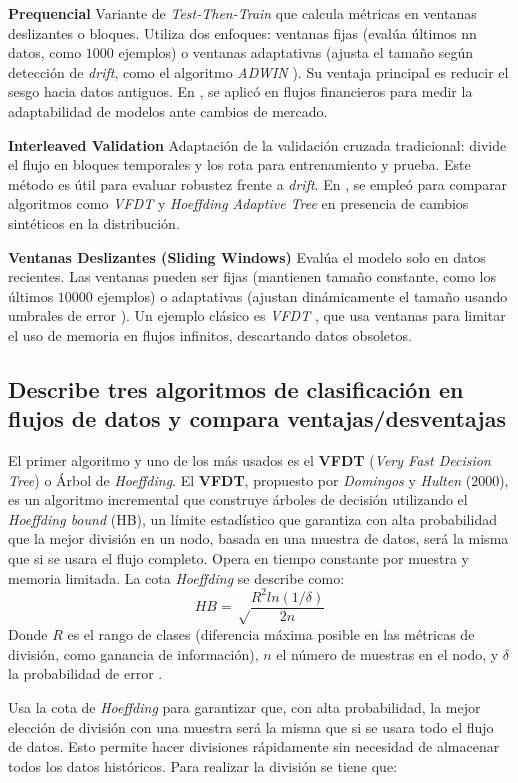 \documentclass[12pt,letterpaper]{article}
\begin{document}
\textbf{Prequencial}
Variante de \textit{Test-Then-Train} que calcula métricas en ventanas deslizantes o bloques. Utiliza dos enfoques: ventanas fijas (evalúa últimos nn datos, como $1000$ ejemplos) o ventanas adaptativas (ajusta el tamaño según detección de \textit{drift}, como el algoritmo \textit{ADWIN} \cite{Bifet2007}). Su ventaja principal es reducir el sesgo hacia datos antiguos. En \cite{Gama2010}, se aplicó en flujos financieros para medir la adaptabilidad de modelos ante cambios de mercado.

\textbf{Interleaved Validation}
Adaptación de la validación cruzada tradicional: divide el flujo en bloques temporales y los rota para entrenamiento y prueba. Este método es útil para evaluar robustez frente a \textit{drift}. En \cite{Gama2014}, se empleó para comparar algoritmos como \textit{VFDT} y \textit{Hoeffding Adaptive Tree} en presencia de cambios sintéticos en la distribución.

\textbf{Ventanas Deslizantes (Sliding Windows)}
Evalúa el modelo solo en datos recientes. Las ventanas pueden ser fijas (mantienen tamaño constante, como los últimos $10000$ ejemplos) o adaptativas (ajustan dinámicamente el tamaño usando umbrales de error \cite{Bifet2009}). Un ejemplo clásico es \textit{VFDT} \cite{Domingos2000}, que usa ventanas para limitar el uso de memoria en flujos infinitos, descartando datos obsoletos.
\newpage
\subsection{Describe tres algoritmos de clasificación en flujos de datos y compara
    ventajas/desventajas}
El primer algoritmo y uno de los más usados es el \textbf{VFDT} (\textit{Very Fast Decision Tree}) o Árbol de \textit{Hoeffding}.
El \textbf{VFDT}, propuesto por \textit{Domingos} y \textit{Hulten} ($2000$), es un algoritmo incremental que construye árboles de decisión utilizando el \textit{Hoeffding bound} (HB), un límite estadístico que garantiza con alta probabilidad que la mejor división en un nodo, basada en una muestra de datos, será la misma que si se usara el flujo completo. Opera en tiempo constante por muestra y memoria limitada. La cota \textit{Hoeffding} se describe como:
$$HB=\sqrt\frac{R^2ln(1/\delta)}{2n}$$
Donde $R$ es el rango de clases (diferencia máxima posible en las métricas de división, como ganancia de información), $n$ el número de muestras en el nodo, y $\delta$ la probabilidad de error \cite{Domingos2000}.

Usa la cota de \textit{Hoeffding} para garantizar que, con alta probabilidad, la mejor elección de división con una muestra será la misma que si se usara todo el flujo de datos. Esto permite hacer divisiones rápidamente sin necesidad de almacenar todos los datos históricos. Para realizar la división se tiene que:
\end{document}
